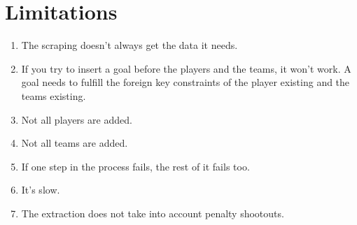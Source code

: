\documentclass{article}
\begin{document}
\section{Limitations}
\begin{enumerate}
	\item The scraping doesn't always get the data it needs. 
	\item If you try to insert a goal before the players and the teams, it won't work. A goal needs to fulfill the foreign key constraints of the player existing and the teams existing.
	\item Not all players are added.
	\item Not all teams are added.
	\item If one step in the process fails, the rest of it fails too.
	\item It's slow.
	\item The extraction does not take into account penalty shootouts.
\end{enumerate}
\end{document}
